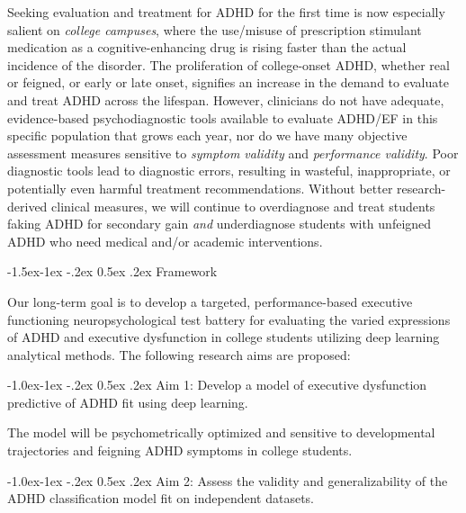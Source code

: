 \documentclass[11pt,]{article}
\makeatletter
\renewcommand\subsection{
  \@startsection{subsection}{2}{\z@}
    {-1.5ex\@plus -1ex \@minus -.2ex}%
    {0.5ex \@plus .2ex}%
    {\normalfont\normalsize\bf}} %
\renewcommand\subsubsection{
  \@startsection{subsubsection}{3}{\z@}
    {-1.0ex\@plus -1ex \@minus -.2ex}%
    {0.5ex \@plus .2ex}%
    {\normalfont\normalsize\bf}} %
\makeatother
\begin{document}
Seeking evaluation and treatment for ADHD for the first time is now
especially salient on \emph{college campuses}, where the use/misuse of
prescription stimulant medication as a cognitive-enhancing drug is
rising faster than the actual incidence of the disorder. The
proliferation of college-onset ADHD, whether real or feigned, or early
or late onset, signifies an increase in the demand to evaluate and treat
ADHD across the lifespan. However, clinicians do not have adequate,
evidence-based psychodiagnostic tools available to evaluate ADHD/EF in
this specific population that grows each year, nor do we have many
objective assessment measures sensitive to \emph{symptom validity} and
\emph{performance validity}. Poor diagnostic tools lead to diagnostic
errors, resulting in wasteful, inappropriate, or potentially even
harmful treatment recommendations. Without better research-derived
clinical measures, we will continue to overdiagnose and treat students
faking ADHD for secondary gain \emph{and} underdiagnose students with
unfeigned ADHD who need medical and/or academic interventions.

\hypertarget{framework}{%
\subsection{Framework}\label{framework}}

Our long-term goal is to develop a targeted, performance-based executive
functioning neuropsychological test battery for evaluating the varied
expressions of ADHD and executive dysfunction in college students
utilizing deep learning analytical methods. The following research aims
are proposed:

\hypertarget{aim-1-develop-a-model-of-executive-dysfunction-predictive-of-adhd-fit-using-deep-learning.}{%
\subsubsection{Aim 1: Develop a model of executive dysfunction
predictive of ADHD fit using deep
learning.}\label{aim-1-develop-a-model-of-executive-dysfunction-predictive-of-adhd-fit-using-deep-learning.}}

The model will be psychometrically optimized and sensitive to
developmental trajectories and feigning ADHD symptoms in college
students.

\hypertarget{aim-2-assess-the-validity-and-generalizability-of-the-adhd-classification-model-fit-on-independent-datasets.}{%
\subsubsection{Aim 2: Assess the validity and generalizability of the
ADHD classification model fit on independent
datasets.}\label{aim-2-assess-the-validity-and-generalizability-of-the-adhd-classification-model-fit-on-independent-datasets.}}
\end{document}
